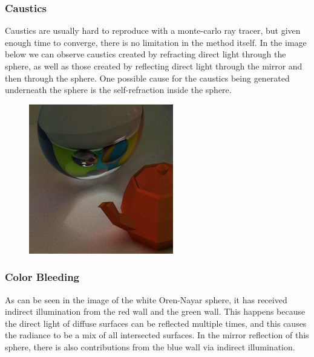 \documentclass[a4paper, twocolumn]{article}
\begin{document}
            \subsubsection*{Caustics}

            Caustics are usually hard to reproduce with a monte-carlo ray tracer, but given enough time to converge, there is no limitation in the method itself. In the image below we can observe caustics created by refracting direct light through the sphere, as well as those created by reflecting direct light through the mirror and then through the sphere. One possible cause for the caustics being generated underneath the sphere is the self-refraction inside the sphere.

            \begin{figure}[H]
                \centering
                \includegraphics[width=0.8\linewidth]{share/new_render_caustics.png}
                \label{fig:render_caustics}
            \end{figure}

            \subsubsection*{Color Bleeding}

            As can be seen in the image of the white Oren-Nayar sphere, it has received indirect illumination from the red wall and the green wall. This happens because the direct light of diffuse surfaces can be reflected multiple times, and this causes the radiance to be a mix of all intersected surfaces. In the mirror reflection of this sphere, there is also contributions from the blue wall via indirect illumination.
\end{document}
